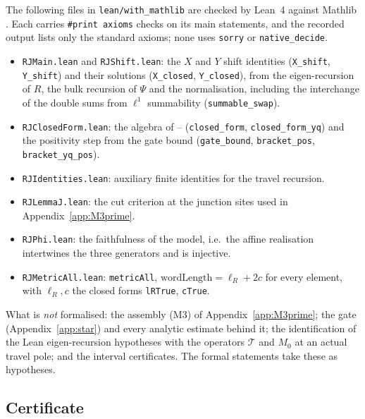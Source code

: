 \documentclass[11pt]{article}
\theoremstyle{plain}
\theoremstyle{definition}
\theoremstyle{remark}
\begin{document}
The following files in \texttt{lean/with\_mathlib} are checked by Lean~4 against Mathlib
\cite{MathlibCommunity}. Each carries \texttt{\#print axioms} checks on its main statements, and the
recorded output lists only the standard axioms; none uses \texttt{sorry} or
\texttt{native\_decide}.
\begin{itemize}
\item \texttt{RJMain.lean} and \texttt{RJShift.lean}: the $X$ and $Y$ shift identities
(\texttt{X\_shift}, \texttt{Y\_shift}) and their solutions (\texttt{X\_closed}, \texttt{Y\_closed}),
from the eigen-recursion of $R$, the bulk recursion of $\Psi$ and the normalisation, including the
interchange of the double sums from $\ell^1$ summability (\texttt{summable\_swap}).
\item \texttt{RJClosedForm.lean}: the algebra of {\cite[\textup{(eq:RJclosed1)}]{Bonfioli2026bA}}--{\cite[\textup{(eq:RJclosedq)}]{Bonfioli2026bA}}
(\texttt{closed\_form}, \texttt{closed\_form\_yq}) and the positivity step from the gate bound
(\texttt{gate\_bound}, \texttt{bracket\_pos}, \texttt{bracket\_yq\_pos}).
\item \texttt{RJIdentities.lean}: auxiliary finite identities for the travel recursion.
\item \texttt{RJLemmaJ.lean}: the cut criterion at the junction sites used in
Appendix~\ref{app:M3prime}.
\item \texttt{RJPhi.lean}: the faithfulness of the model, i.e.\ the affine realisation intertwines
the three generators and is injective.
\item \texttt{RJMetricAll.lean}: \texttt{metricAll}, $\mathrm{wordLength}=\ell_R+2c$ for every
element, with $\ell_R,c$ the closed forms \texttt{lRTrue}, \texttt{cTrue}.
\end{itemize}
What is \emph{not} formalised: the assembly \textup{(M3)} of Appendix~\ref{app:M3prime}; the gate
(Appendix~\ref{app:star}) and every analytic estimate behind it; the identification of the Lean
eigen-recursion hypotheses with the operators $\mathcal T$ and $M_0$ at an actual travel pole; and
the interval certificates. The formal statements take these as hypotheses.

\subsection{Certificate}\label{sec:assemblycert}
\end{document}
